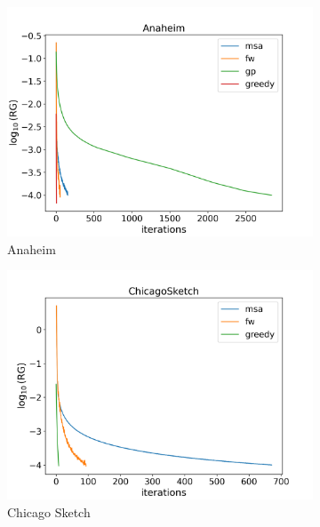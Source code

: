 \begin{figure}
\caption{$\log$(RG) vs number of iterations plots}
\begin{subfigure}{0.5\linewidth}
\centering
\includegraphics[width=\textwidth]{figures/Anaheim.png}
\caption{Anaheim}
\end{subfigure}
\hfill
\begin{subfigure}{0.5\linewidth}
\includegraphics[width=\textwidth]{figures/ChicagoSketch.png}
\caption{Chicago Sketch}
\end{subfigure}
\hfill
\begin{subfigure}{0.5\linewidth}
\centering

\end{subfigure}
\end{figure}
